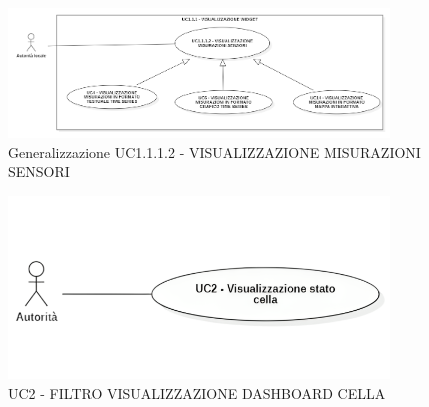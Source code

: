 





\begin{figure}[H]
    \centering
    \includegraphics[width=0.9\textwidth]{../Images/uc1.1.1.2Gen.PNG}
    \caption{Generalizzazione UC1.1.1.2 - VISUALIZZAZIONE MISURAZIONI SENSORI}
    \label{fig:UC3_gen}
\end{figure}









\begin{figure}[H]
    \centering
    \includegraphics[width=0.9\textwidth]{../Images/uc2.png}
    \caption{UC2 - FILTRO VISUALIZZAZIONE DASHBOARD CELLA}
    \label{fig:UC2}
\end{figure}

